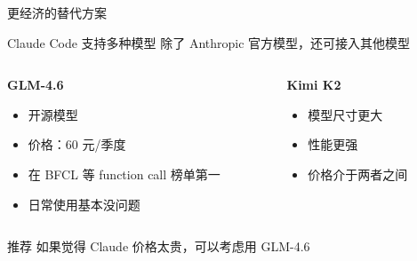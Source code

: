 \documentclass[aspectratio=169,xcolor=dvipsnames]{beamer}
\begin{document}
\begin{frame}{更经济的替代方案}
  \begin{block}{Claude Code 支持多种模型}
    除了 Anthropic 官方模型，还可接入其他模型
  \end{block}

  \vspace{0.3cm}

  \begin{columns}
    \begin{column}{0.48\textwidth}
      \textbf{GLM-4.6}
      \begin{itemize}
        \item 开源模型
        \item 价格：60 元/季度
        \item 在 BFCL 等 function call 榜单第一
        \item 日常使用基本没问题
      \end{itemize}
    \end{column}
    \begin{column}{0.48\textwidth}
      \textbf{Kimi K2}
      \begin{itemize}
        \item 模型尺寸更大
        \item 性能更强
        \item 价格介于两者之间
      \end{itemize}
    \end{column}
  \end{columns}

  \vspace{0.3cm}

  \begin{exampleblock}{推荐}
    如果觉得 Claude 价格太贵，可以考虑用 GLM-4.6
  \end{exampleblock}
\end{frame}
\end{document}

